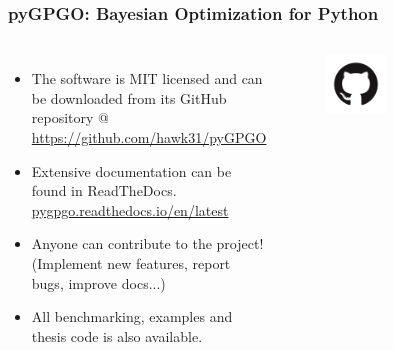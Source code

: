 \documentclass[10pt]{beamer}
\begin{document}
\begin{frame}
\frametitle{pyGPGO: Bayesian Optimization for Python}
\begin{columns}
\centering
\begin{itemize}
\item The software is MIT licensed and can be downloaded from its GitHub repository @ \textcolor{blue}{\url{https://github.com/hawk31/pyGPGO}}
\item Extensive documentation can be found in ReadTheDocs. \textcolor{blue}{\url{pygpgo.readthedocs.io/en/latest}}
\item Anyone can contribute to the project! (Implement new features, report bugs, improve docs...)
\item All benchmarking, examples and thesis code is also available. 
\end{itemize}
\begin{figure}
\includegraphics[width=0.4\textwidth]{figures/github}
\end{figure}
\end{columns}
\end{frame}
\end{document}
